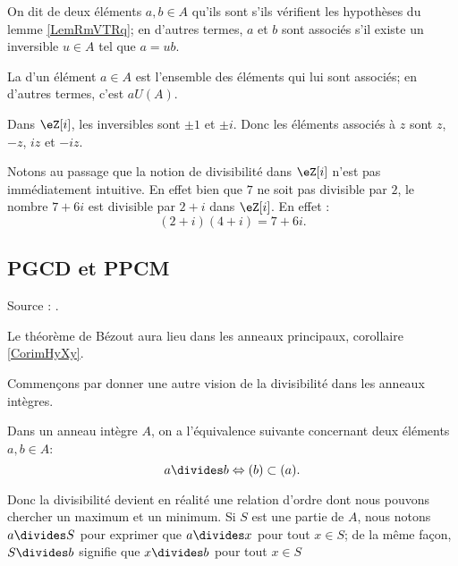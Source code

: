 \begin{definition}\label{DefrXUixs}
    On dit de deux éléments \( a,b\in A\) qu'ils sont  s'ils vérifient les hypothèses du lemme \ref{LemRmVTRq}; en d'autres termes, $a$ et $b$ sont associés s'il existe un inversible \( u\in A\) tel que \( a=ub\).

    La  d'un élément \( a \in A \) est l'ensemble des éléments qui lui sont associés; en d'autres termes, c'est \( a  U(A) \).
\end{definition}

\begin{example}
    Dans \( \eZ[i]\), les inversibles sont \( \pm 1\) et \( \pm i\). Donc les éléments associés à \( z\) sont \( z\), \( -z\), \( iz\) et \( -iz\).

    Notons au passage que la notion de divisibilité dans \( \eZ[i]\) n'est pas immédiatement intuitive. En effet bien que \( 7\) ne soit pas divisible par \( 2\), le nombre \( 7+6i\) est divisible par \( 2+i\) dans \( \eZ[i]\). En effet :
    \begin{equation}
        (2+i)(4+i)=7+6i.
    \end{equation}
\end{example}


\subsection{PGCD et PPCM}
Source : \cite{XPXxPl}.

Le théorème de Bézout aura lieu dans les anneaux principaux, corollaire \ref{CorimHyXy}.

Commençons par donner une autre vision de la divisibilité dans les anneaux intègres.
\begin{proposition}\label{PropDiviseurIdeaux}
Dans un anneau intègre $A$, on a l'équivalence suivante concernant deux éléments \( a, b \in A \):
\begin{equation}
    a\divides b\Leftrightarrow (b)\subset (a).
\end{equation}
\end{proposition}

Donc la divisibilité devient en réalité une relation d'ordre dont nous pouvons chercher un maximum et un minimum. Si \( S\) est une partie de \( A\), nous notons \( a\divides S\) pour exprimer que \( a\divides x\) pour tout \( x\in S\); de la même façon, \( S\divides b\) signifie que \( x\divides b\) pour tout \( x\in S\)

